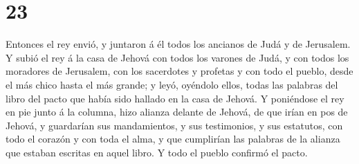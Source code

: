 \hypertarget{section-22}{%
\section{23}\label{section-22}}

 Entonces el rey envió, y juntaron á él todos los ancianos
de Judá y de Jerusalem.  Y subió el rey á la casa de Jehová
con todos los varones de Judá, y con todos los moradores de Jerusalem,
con los sacerdotes y profetas y con todo el pueblo, desde el más chico
hasta el más grande; y leyó, oyéndolo ellos, todas las palabras del
libro del pacto que había sido hallado en la casa de Jehová.
 Y poniéndose el rey en pie junto á la columna, hizo alianza
delante de Jehová, de que irían en pos de Jehová, y guardarían sus
mandamientos, y sus testimonios, y sus estatutos, con todo el corazón y
con toda el alma, y que cumplirían las palabras de la alianza que
estaban escritas en aquel libro. Y todo el pueblo confirmó el pacto.

